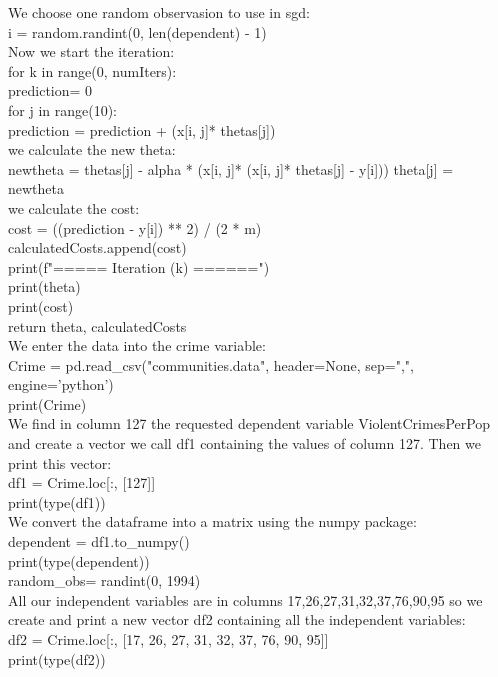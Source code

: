 \documentclass[10pt,a4paper]{article}
\begin{document}
We choose one random observasion to use in sgd:\\
i = random.randint(0, len(dependent) - 1)\\

Now we start the iteration:\\
for k in range(0, numIters):\\
prediction= 0\\
for j in range(10):\\
prediction = prediction + (x[i, j]* thetas[j])\\

we calculate the new theta:\\
newtheta = thetas[j] - alpha * (x[i, j]* (x[i, j]* thetas[j] - y[i]))
theta[j] = newtheta\\

we calculate the cost:\\
cost = ((prediction - y[i]) ** 2) / (2 * m)\\
calculatedCosts.append(cost)\\
print(f"===== Iteration ({k}) ======")\\
print(theta)\\
print(cost)\\
return theta, calculatedCosts\\

We enter the data into the crime variable:\\
Crime = pd.read\_csv("communities.data", header=None, sep=",", engine='python')\\
print(Crime)\\

We find in column 127 the requested dependent variable ViolentCrimesPerPop and create a vector we call df1 containing the values of column 127. Then we print this vector:\\
df1 = Crime.loc[:, [127]]\\
print(type(df1))\\

We convert the dataframe into a matrix using the numpy package:\\
dependent = df1.to\_numpy()\\
print(type(dependent))\\
random\_obs= randint(0, 1994)\\

All our independent variables are in columns 17,26,27,31,32,37,76,90,95 so we create and print a new vector df2 containing all the independent variables:\\
df2 = Crime.loc[:, [17, 26, 27, 31, 32, 37, 76, 90, 95]]\\
print(type(df2))\\
\end{document}
